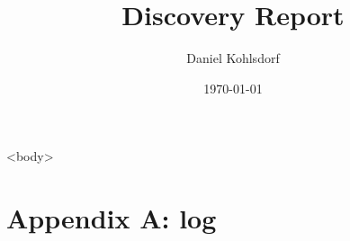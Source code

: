 \documentclass{report}
\title{Discovery Report}
\author{Daniel Kohlsdorf}
\date{\today}
\begin{document}
\maketitle
\tableofcontents
    <body>
\chapter{Appendix A: log} 
\end{document}
